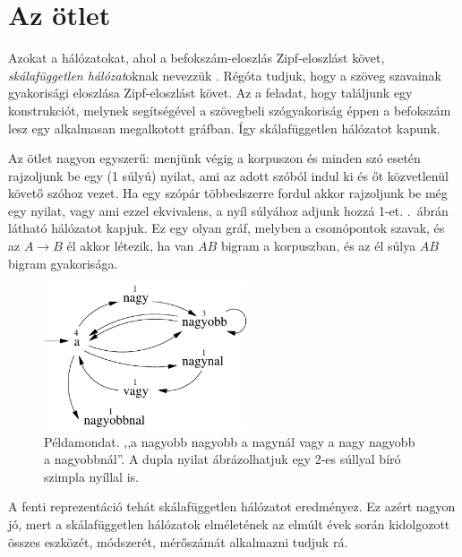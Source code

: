 \documentclass{llncs}
\newcommand{\matnyil}{\ensuremath{\rightarrow}}
\begin{document}
\section{Az ötlet}

Azokat a hálózatokat, ahol a befokszám-eloszlás
Zipf-eloszlást követ, \emph{skálafüggetlen hálózat}oknak nevezzük
\cite[703.\ oldal]{kovacs2012magyar}.
%
Régóta tudjuk, hogy a szöveg szavainak gyakorisági eloszlása
Zipf-eloszlást követ.
%
Az a feladat, hogy találjunk egy konstrukciót,
melynek segítségével a szövegbeli szógyakoriság
éppen a befokszám lesz egy alkalmasan megalkotott gráfban.
%
Így skálafüggetlen hálózatot kapunk.

Az ötlet nagyon egyszerű:
menjünk végig a korpuszon és
minden szó esetén rajzoljunk be egy (1 súlyú) nyilat,
ami az adott szóból indul ki és őt közvetlenül követő szóhoz vezet.
%
Ha egy szópár többedszerre fordul akkor rajzoljunk be még egy nyilat,
vagy ami ezzel ekvivalens, a nyíl súlyához adjunk hozzá 1-et.
%
.\ ábrán látható hálózatot kapjuk.
%
Ez egy olyan gráf, melyben a csomópontok szavak,
és az $A\matnyil B$ él akkor létezik, ha van $AB$ bigram a korpuszban,
és az él súlya $AB$ bigram gyakorisága.

\begin{figure}[ht]
\begin{center}
\includegraphics[width=6cm]{scfr_pelda.pdf}
\end{center}
\caption{Példamondat.
,,a nagyobb nagyobb a nagynál vagy a nagy nagyobb a nagyobbnál''.
  A dupla nyilat ábrázolhatjuk egy 2-es súllyal bíró szimpla nyíllal is.}
\label{fig:scfr_pelda}
\end{figure}

A fenti reprezentáció tehát skálafüggetlen hálózatot eredményez.
%
Ez azért nagyon jó, mert a skálafüggetlen hálózatok elméletének
\cite{barabasi2009scalefree}
az elmúlt évek során kidolgozott összes 
eszközét, módszerét, mérőszámát alkalmazni tudjuk rá.
\end{document}
